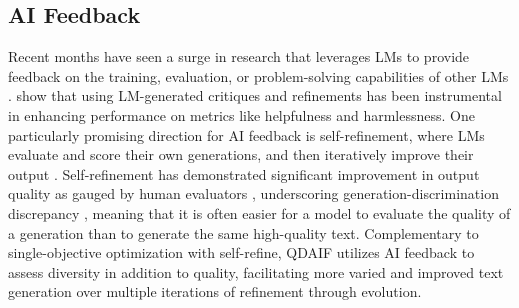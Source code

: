 \subsection{AI Feedback}\label{main:ai_feedback}
Recent months have seen a surge in research that leverages LMs to provide feedback on the training, evaluation, or problem-solving capabilities of other LMs \citep{bai2022constitutional, perez2022discovering, shinn2023reflexion, wang2023voyager, colas2023augmenting, zhang2023omni, lee2023rlaif}. \citet{bai2022constitutional} show that using LM-generated critiques and refinements has been instrumental in enhancing performance on metrics like helpfulness and harmlessness. One particularly promising direction for AI feedback is self-refinement, where LMs evaluate and score their own generations, and then iteratively improve their output \citep{bai2022constitutional,madaan2023self}. Self-refinement has demonstrated significant improvement in output quality as gauged by human evaluators \citep{madaan2023self}, underscoring generation-discrimination discrepancy \citep[p.12]{saunders2022self}, meaning that it is often easier for a model to evaluate the quality of a generation than to generate the same high-quality text. Complementary to single-objective optimization with self-refine, QDAIF utilizes AI feedback to assess diversity in addition to quality, facilitating more varied and improved text generation over multiple iterations of refinement through evolution.





